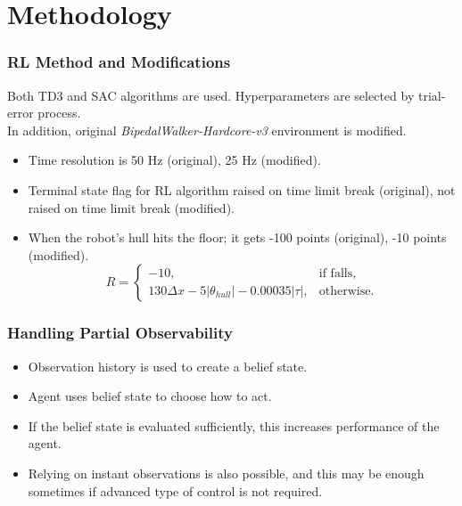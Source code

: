 \documentclass{beamer}
\begin{document}

\section{Methodology}

\begin{frame}
\frametitle{RL Method and Modifications}
Both TD3 and SAC algorithms are used. Hyperparameters are selected by trial-error process. \\
In addition, original \textit{BipedalWalker-Hardcore-v3} environment is modified.\\
\begin{itemize}
	\item Time resolution is 50 Hz (original), 25 Hz (modified).
	\item Terminal state flag for RL algorithm raised on time limit break (original), not raised on time limit break (modified). 
	\item When the robot's hull hits the floor; it gets -100 points (original), -10 points (modified). 
	\begin{equation}
	\label{eqn:reward_fcn}
	R = 
	\begin{cases}
	-10,   & \text{if falls} ,\\
	130 \Delta x -5 |\theta_{hull}| - 0.00035 |\tau|,   & \text{otherwise}.
	\end{cases}
	\end{equation}
\end{itemize}
\end{frame}

\begin{frame}
\frametitle{Handling Partial Observability}
\begin{itemize}
	\item Observation history is used to create a belief state. 
	\item Agent uses belief state to choose how to act. 
	\item If the belief state is evaluated sufficiently, this increases performance of the agent. 
	\item Relying on instant observations is also possible, and this may be enough sometimes if advanced type of control is not required.
\end{itemize}
\end{frame}
\end{document}

